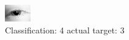 \begin{figure}[h!]
\begin{center}
\includegraphics[width=0.60\columnwidth]{figures/ID148_class_4_target_3.png}
\end{center}
\caption{ Classification: 4 actual target: 3}
\label{fig:ID148_class_4_target_3}
\end{figure}
